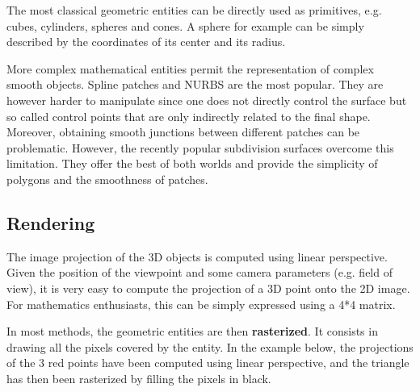 The most classical geometric entities can be directly used as primitives, e.g. cubes, cylinders, spheres and 
cones. A sphere for example can be simply described by the coordinates of its center and its radius.

More  complex  mathematical  entities  permit  the  representation  of  complex  smooth  objects.  Spline 
patches  and  NURBS  are  the  most  popular. They  are  however  harder  to  manipulate  since  one  does  not directly  control  the  surface  but  so  called control points that are only indirectly related to the final shape. Moreover, obtaining smooth junctions between different patches can be problematic. However, the recently popular subdivision surfaces overcome this limitation. They offer the best of both worlds and provide the simplicity of polygons and the smoothness of patches.

\subsection{Rendering}

The image projection of the 3D objects is computed using linear perspective. Given the position of the viewpoint  and  some  camera  parameters  (e.g.  field  of  view),  it  is  very  easy  to  compute  the  projection of a 3D point onto the 2D image. For mathematics enthusiasts, this can be simply expressed 
using a 4*4 matrix. 

In most methods, the geometric entities are then \textbf{rasterized}. It consists in drawing all the pixels covered by the entity. In the example below, the projections of the 3 red points have been computed using linear perspective, and  the  triangle  has  then  been  rasterized  by  filling  the  pixels  in  black. 

\begin{figure}[H]
\centering
{}
\end{figure}

